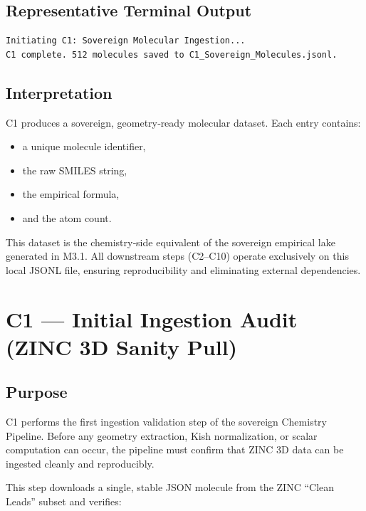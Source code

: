 \documentclass[11pt, letterpaper, openany]{book}
\begin{document}
\subsection*{Representative Terminal Output}
\begin{lstlisting}[style=terminal]
Initiating C1: Sovereign Molecular Ingestion...
C1 complete. 512 molecules saved to C1_Sovereign_Molecules.jsonl.
\end{lstlisting}

\subsection*{Interpretation}
C1 produces a sovereign, geometry‑ready molecular dataset. Each entry contains:

\begin{itemize}
    \item a unique molecule identifier,
    \item the raw SMILES string,
    \item the empirical formula,
    \item and the atom count.
\end{itemize}

This dataset is the chemistry‑side equivalent of the sovereign empirical lake
generated in M3.1. All downstream steps (C2–C10) operate exclusively on this
local JSONL file, ensuring reproducibility and eliminating external dependencies.


\section{C1 — Initial Ingestion Audit (ZINC 3D Sanity Pull)}

\subsection*{Purpose}
C1 performs the first ingestion validation step of the sovereign Chemistry
Pipeline. Before any geometry extraction, Kish normalization, or scalar
computation can occur, the pipeline must confirm that ZINC 3D data can be
ingested cleanly and reproducibly.

This step downloads a single, stable JSON molecule from the ZINC ``Clean Leads''
subset and verifies:
\end{document}
